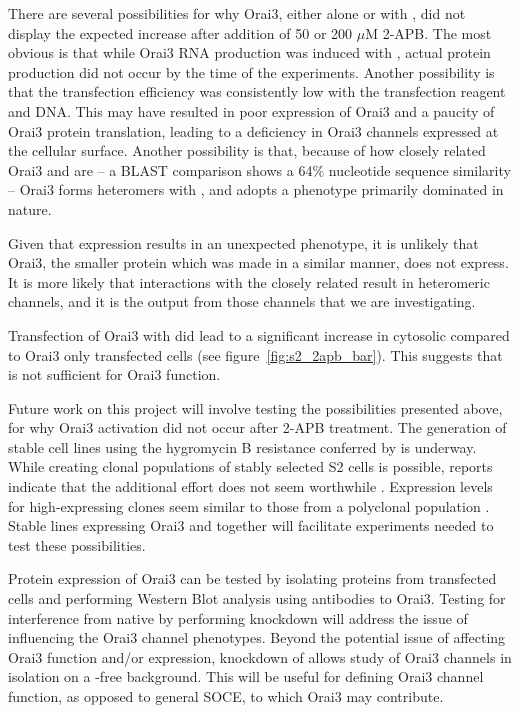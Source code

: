 There are several possibilities for why Orai3, either alone or with \stim{}, did not display the expected \Ca{} increase after addition of 50 or 200 $\mu$M 2-APB. The most obvious is that while Orai3 RNA production was induced with \cuso, actual protein production did not occur by the time of the experiments. Another possibility is that the transfection efficiency was consistently low with the transfection reagent and \oraiiiivector{} DNA. This may have resulted in poor expression of Orai3 and a paucity of Orai3 protein translation, leading to a deficiency in Orai3 channels expressed at the cellular surface.
Another possibility is that, because of how closely related Orai3 and \dorai{} are -- a BLAST comparison shows a 64\% nucleotide sequence similarity -- Orai3 forms heteromers with \dorai, and adopts a phenotype primarily \dorai{} dominated in nature.  

Given that \stim{} expression results in an unexpected phenotype, it is unlikely that Orai3, the smaller protein which was made in a similar manner, does not express. It is more likely that interactions with the closely related \dorai{} result in heteromeric channels, and it is the output from those channels that we are investigating.

Transfection of Orai3 with \stim{} did lead to a significant increase in cytosolic \Ca{} compared to Orai3 only transfected cells (see figure~\ref{fig:s2_2apb_bar}). This suggests that \dstim{} is not sufficient for Orai3 function.
 
Future work on this project will involve testing the possibilities presented above, for why Orai3 activation did not occur after 2-APB treatment. The generation of stable cell lines using the hygromycin B resistance conferred by \puchygmt{}  is underway. While creating clonal populations of stably selected S2 cells is possible, reports indicate that the additional effort does not seem worthwhile \cite{Schetz2004}. Expression levels for high-expressing clones seem similar to those from a polyclonal population \cite{Schetz2004}.
Stable lines expressing  Orai3 and \stim{} together will facilitate experiments needed to test these possibilities. 

Protein expression of Orai3 can be tested by isolating proteins from transfected cells and performing Western Blot analysis using antibodies to Orai3. Testing for interference from native \dorai{} by performing \rnai{} knockdown will address the issue of \dorai{} influencing the Orai3 channel phenotypes. Beyond the potential issue of \dorai{} affecting Orai3 function and/or expression, \rnai{} knockdown of \dorai{} allows study of Orai3 channels in isolation on a \dorai{}-free background. This will be useful for defining Orai3 channel function, as opposed to general SOCE, to which Orai3 may contribute.

